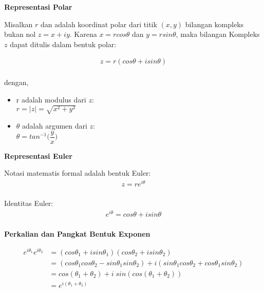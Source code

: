 \documentclass{article}
\begin{document}
    \newpage
    \begin{center}
        \textbf{Representasi Polar}
    \end{center}

    Misalkan $r$ dan adalah koordinat polar dari titik $(x, y)$ bilangan kompleks bukan nol $z = x + iy$. Karena $x = r cos \theta $ dan $y = r sin \theta$, maka bilangan Kompleks $z$ dapat
    ditulis dalam bentuk polar:

    \begin{align}
        z = r(cos \theta + i sin \theta)\\\nonumber
    \end{align}

    dengan,
    \begin{itemize}
        \item r adalah modulus dari $z$:\\
            $ r = |z| = \sqrt{x^2+y^2} $
        \item $\theta$ adalah argumen dari $z$:\\
            $ \theta = tan^{-1} \bigg(\dfrac{y}{x}\bigg) $
    \end{itemize}


    \begin{center}
        \textbf{Representasi Euler}
    \end{center}

    Notasi matematis formal adalah bentuk Euler:
    \begin{align}
        z = re^{i\theta}\\\nonumber
    \end{align}

    Identitas Euler:
    \begin{align}
        e^{i\theta} = cos\theta + i sin\theta \\\nonumber
    \end{align}

    \begin{center}
        \textbf{Perkalian dan Pangkat Bentuk Exponen}
    \end{center}
    \begin{align}
        e^{i\theta_1} e^{i\theta_2} &= (cos\theta_1 + i sin\theta_1)(cos\theta_2 + i sin\theta_2)
                                    \nonumber\\
                                    &=(cos\theta_1 cos\theta_2 - sin\theta_1 sin\theta_2) + i(sin\theta_1cos\theta_2 + cos\theta_1 sin\theta_2)
                                    \nonumber\\
                                    &= cos(\theta_1 + \theta_2) + i\;sin(cos(\theta_1 + \theta_2))
                                    \nonumber\\
                                    &= e^{i(\theta_1 + \theta_2)}
    \end{align}
    
\end{document}
